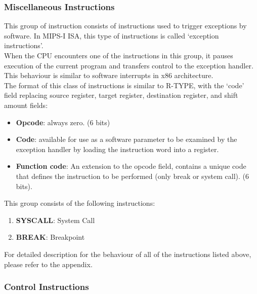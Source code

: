 \documentclass[oneside]{book}
\begin{document}
\subsubsection{Miscellaneous Instructions}

This group of instruction consists of instructions used to trigger
exceptions by software. In MIPS-I ISA, this type of instructions is
called `exception instructions'.\\

When the CPU encounters one of the instructions in this group,
it pauses execution of the current program and transfers control
to the exception handler. This behaviour is similar to
software interrupts in x86 architecture.\\

The format of this class of instructions is similar to R-TYPE,
with the `code' field replacing source register,
target register, destination register, and shift amount fields:

\begin{itemize}

\item \textbf{Opcode}: always zero. (6 bits)

\item \textbf{Code}: available for use as a software parameter to be
                     examined by the exception handler by loading
                     the instruction word into a register.

\item \textbf{Function code}: An extension to the opcode field, contains
                              a unique code that defines the instruction
                              to be performed (only break or system call).
                              (6 bits).

\end{itemize}

This group consists of the following instructions:

\begin{enumerate}

\item \textbf{SYSCALL}: System Call
\item \textbf{BREAK}:   Breakpoint

\end{enumerate}

For detailed description for the behaviour of all of the instructions listed
above, please refer to the appendix.

\subsubsection{Control Instructions}
\end{document}
